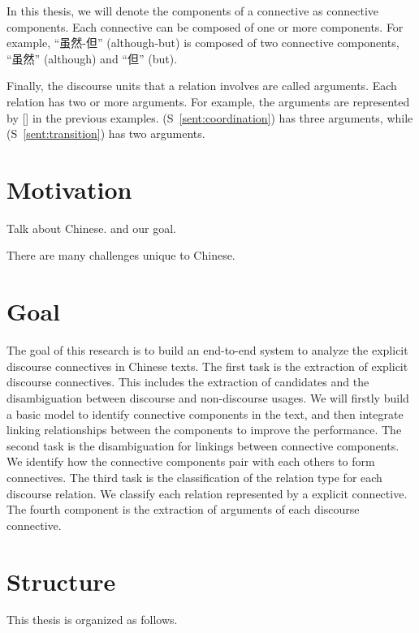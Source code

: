 In this thesis, we will denote the components of a connective as connective components.
Each connective can be composed of one or more components. For example, ``虽然-但'' (although-but)
is composed of two connective components, ``虽然'' (although) and ``但'' (but).

Finally, the discourse units that a relation involves are called arguments. Each relation
has two or more arguments. For example, the arguments are represented by [] in the previous
examples. (S~\ref{sent:coordination}) has three arguments, while
(S~\ref{sent:transition}) has two arguments.


%
%
\section{Motivation}

Talk about Chinese. and our goal.

There are many challenges unique to Chinese.


%
%
\section{Goal}

The goal of this research is to build an end-to-end system to analyze the explicit discourse
connectives in Chinese texts. The first task is the extraction of explicit discourse
connectives. This includes the extraction of candidates and the disambiguation between discourse
and non-discourse usages. We will firstly build a basic model to identify connective components
in the text, and then integrate linking relationships between the components to improve
the performance. The second task is the disambiguation for linkings between connective components.
We identify how the connective components pair with each others to form connectives.
The third task is the classification of the relation type for each discourse relation. We classify
each relation represented by a explicit connective.
The fourth component is the extraction of arguments of each discourse connective.

%
%
\section{Structure}
This thesis is organized as follows.
